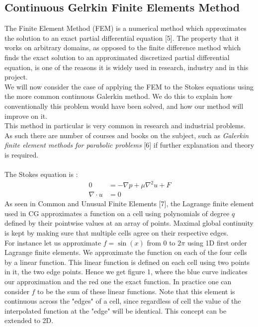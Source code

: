 \documentclass[11pt,twoside,a4paper]{article}
\begin{document}
\subsection{Continuous Gelrkin Finite Elements Method}
The Finite Element Method (FEM) is a numerical method which approximates the solution to an exact partial differential equation [5]. The property that it works on arbitrary domains, as opposed to the finite difference method which finds the exact solution to an approximated discretized partial differential equation, is one of the reasons it is widely used in research, industry and in this project.\\
We will now consider the case of applying the FEM to the Stokes equations using the more common continuous Galerkin method. We do this to explain how conventionally this problem would have been solved, and how our method will improve on it.\\
This method in particular is very common in research and industrial problems. As such there are number of courses and books on the subject, such as \textit{Galerkin finite element methods for parabolic problems} [6] if further explanation and theory is required.\\
\\
The Stokes equation is :
\begin{align}
0 &= -\nabla p + \mu \nabla^2 u + F \\
\nabla \cdot u &= 0
\end{align}
As seen in Common and Unusual Finite Elements [7], the Lagrange finite element used in CG approximates a function on a cell using polynomials of degree $q$ defined by their pointwise values at an array of points. Maximal global continuity is kept by making sure  that multiple cells agree on their respective edges.\\
For instance let us approximate $f = \sin(x)$ from $0$ to $2 \pi$ using 1D first order Lagrange finite elements. We approximate the function on each of the four cells by a linear function. This linear function is defined on each cell using two points in it, the two edge points. Hence we get figure 1, where the blue curve indicates our approximation and the red one the exact function. In practice one can consider $f$ to be the sum of these linear functions. Note that this element is continuous across the "edges" of a cell, since regardless of cell the value of the interpolated function at the "edge" will be identical. This concept can be extended to 2D.\\
\end{document}
